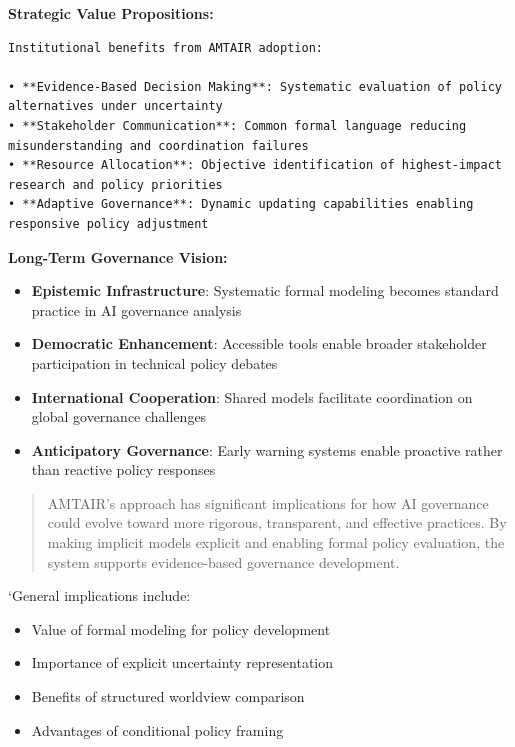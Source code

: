 \documentclass[
  11pt,
  letterpaper,
]{book}
\providecommand{\tightlist}{%
  \setlength{\itemsep}{0pt}\setlength{\parskip}{0pt}}
\begin{document}
\textbf{Strategic Value Propositions:}

\begin{verbatim}
Institutional benefits from AMTAIR adoption:

• **Evidence-Based Decision Making**: Systematic evaluation of policy alternatives under uncertainty
• **Stakeholder Communication**: Common formal language reducing misunderstanding and coordination failures  
• **Resource Allocation**: Objective identification of highest-impact research and policy priorities
• **Adaptive Governance**: Dynamic updating capabilities enabling responsive policy adjustment
\end{verbatim}

\textbf{Long-Term Governance Vision:}

\begin{itemize}
\tightlist
\item
  \textbf{Epistemic Infrastructure}: Systematic formal modeling becomes
  standard practice in AI governance analysis
\item
  \textbf{Democratic Enhancement}: Accessible tools enable broader
  stakeholder participation in technical policy debates
\item
  \textbf{International Cooperation}: Shared models facilitate
  coordination on global governance challenges
\item
  \textbf{Anticipatory Governance}: Early warning systems enable
  proactive rather than reactive policy responses
\end{itemize}

\begin{quote}
AMTAIR's approach has significant implications for how AI governance
could evolve toward more rigorous, transparent, and effective practices.
By making implicit models explicit and enabling formal policy
evaluation, the system supports evidence-based governance development.
\end{quote}

`General implications include:

\begin{itemize}
\tightlist
\item
  Value of formal modeling for policy development
\item
  Importance of explicit uncertainty representation
\item
  Benefits of structured worldview comparison
\item
  Advantages of conditional policy framing
\end{itemize}
\end{document}
